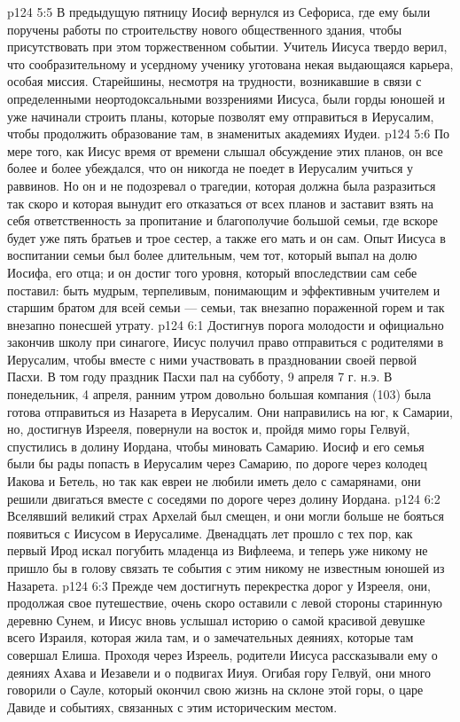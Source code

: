 \vs p124 5:5 В предыдущую пятницу Иосиф вернулся из Сефориса, где ему были поручены работы по строительству нового общественного здания, чтобы присутствовать при этом торжественном событии. Учитель Иисуса твердо верил, что сообразительному и усердному ученику уготована некая выдающаяся карьера, особая миссия. Старейшины, несмотря на трудности, возникавшие в связи с определенными неортодоксальными воззрениями Иисуса, были горды юношей и уже начинали строить планы, которые позволят ему отправиться в Иерусалим, чтобы продолжить образование там, в знаменитых академиях Иудеи.
\vs p124 5:6 По мере того, как Иисус время от времени слышал обсуждение этих планов, он все более и более убеждался, что он никогда не поедет в Иерусалим учиться у раввинов. Но он и не подозревал о трагедии, которая должна была разразиться так скоро и которая вынудит его отказаться от всех планов и заставит взять на себя ответственность за пропитание и благополучие большой семьи, где вскоре будет уже пять братьев и трое сестер, а также его мать и он сам. Опыт Иисуса в воспитании семьи был более длительным, чем тот, который выпал на долю Иосифа, его отца; и он достиг того уровня, который впоследствии сам себе поставил: быть мудрым, терпеливым, понимающим и эффективным учителем и старшим братом для всей семьи --- семьи, так внезапно пораженной горем и так внезапно понесшей утрату.
\vs p124 6:1 Достигнув порога молодости и официально закончив школу при синагоге, Иисус получил право отправиться с родителями в Иерусалим, чтобы вместе с ними участвовать в праздновании своей первой Пасхи. В том году праздник Пасхи пал на субботу, 9 апреля 7 г. н.э. В понедельник, 4 апреля, ранним утром довольно большая компания (103) была готова отправиться из Назарета в Иерусалим. Они направились на юг, к Самарии, но, достигнув Изрееля, повернули на восток и, пройдя мимо горы Гелвуй, спустились в долину Иордана, чтобы миновать Самарию. Иосиф и его семья были бы рады попасть в Иерусалим через Самарию, по дороге через колодец Иакова и Бетель, но так как евреи не любили иметь дело с самарянами, они решили двигаться вместе с соседями по дороге через долину Иордана.
\vs p124 6:2 Вселявший великий страх Архелай был смещен, и они могли больше не бояться появиться с Иисусом в Иерусалиме. Двенадцать лет прошло с тех пор, как первый Ирод искал погубить младенца из Вифлеема, и теперь уже никому не пришло бы в голову связать те события с этим никому не известным юношей из Назарета.
\vs p124 6:3 Прежде чем достигнуть перекрестка дорог у Изрееля, они, продолжая свое путешествие, очень скоро оставили с левой стороны старинную деревню Сунем, и Иисус вновь услышал историю о самой красивой девушке всего Израиля, которая жила там, и о замечательных деяниях, которые там совершал Елиша. Проходя через Изреель, родители Иисуса рассказывали ему о деяниях Ахава и Иезавели и о подвигах Ииуя. Огибая гору Гелвуй, они много говорили о Сауле, который окончил свою жизнь на склоне этой горы, о царе Давиде и событиях, связанных с этим историческим местом.
